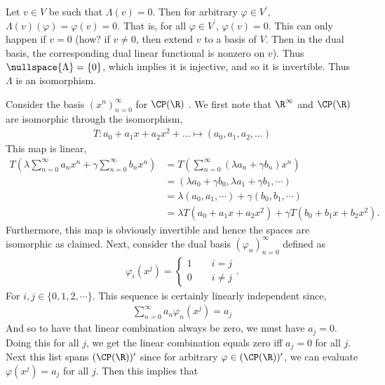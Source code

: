 \documentclass{book}
\begin{document}
\begin{enumerate}[label=\arabic*)]
\begin{enumerate}[label=\alph*)]
          Let $v \in V$ be such that $\Lambda(v) = 0$. Then for arbitrary $\varphi \in V^{\prime}$, $\Lambda(v)(\varphi) = \varphi(v) = 0$. That is, for all $\varphi \in V^{\prime}$,
          $\varphi(v) = 0$. This can only happen if $v = 0$ (how? if $v \neq 0$, then extend $v$ to a basis of $V$. Then in the dual basis, the corresponding dual linear functional is
          nonzero on $v$). Thus $\nullspace{\Lambda} = \{0\}$, which implies it is injective, and so it is invertible. Thus $\Lambda$ is an isomorphism.
      \end{enumerate}
    \ii
    Consider the basis $(x^n)_{n = 0}^{\infty}$ for $\CP(\R)$ . We first note that $\R^\infty$ and $\CP(\R)$ are isomorphic through the isomorphism,
    \begin{align*}
      T: a_0 + a_1x + a_2x^2 + \dots \mapsto (a_0, a_1, a_2, \dots)
    \end{align*}
    This map is linear,
    \begin{align*}
      T\left(\lambda\sum_{n = 0}^{\infty}a_nx^n + \gamma\sum_{n = 0}^{\infty}b_nx^n\right) & = T\left(\sum_{n = 0}^{\infty}(\lambda a_n + \gamma b_n)x^n\right) \\
      & = (\lambda a_0 + \gamma b_0, \lambda a_1 + \gamma b_1, \cdots) \\
      & = \lambda(a_0, a_1, \cdots) + \gamma(b_0, b_1, \cdots) \\
      & = \lambda T(a_0 + a_1x + a_2x^2) + \gamma T(b_0 + b_1x + b_2x^2).
    \end{align*}
    Furthermore, this map is obviously invertible and hence the spaces are isomorphic as claimed. Next, consider the dual basis $(\varphi_n)_{n = 0}^{\infty}$ defined as
    \begin{align*}
      \varphi_i(x^j) = 
        \begin{cases}
          1 \qquad i = j \\
          0 \qquad i \neq j 
        \end{cases}.
    \end{align*}
    For $i, j \in \{0, 1, 2, \cdots\}$. This sequence is certainly linearly independent since,
    \begin{align*}
      \sum_{n = 0}^{\infty}a_n\varphi_n(x^j) = a_j
    \end{align*}
    And so to have that linear combination always be zero, we must have $a_j = 0$. Doing this for all $j$, we get the linear combination equals zero iff $a_j = 0$ for all $j$. Next this list
    spans $(\CP(\R))^{\prime}$ since for arbitrary $\varphi \in (\CP(\R))^{\prime}$, we can evaluate $\varphi(x^j) = a_j$ for all $j$. Then this implies that

\end{enumerate}
\end{document}
